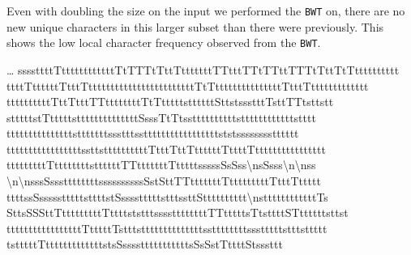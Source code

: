 \documentclass{article}
\begin{document}
Even with doubling the size on the input we performed the \texttt{BWT} on, there are no new unique characters in this larger subset than there were previously. This shows the low local character frequency observed from the \texttt{BWT}.
\begin{center}\footnotesize
\dots
ssssttttTttttttttttttTtTTTtTttTtttttttTTtttTTtTTttTTTtTttTtTtttttttttt
ttttTttttttTtttTttttttttttttttttttttttttTtTtttttttttttttttTtttTttttttttttttt
ttttttttttTttTtttTTttttttttTtTtttt\textvisiblespace tstttttt\textvisiblespace Stt\textvisiblespace st\textvisiblespace ssstttT\textvisiblespace st\textvisiblespace tTTtstt\textvisiblespace stt
stt\textvisiblespace tttstTtttttsttttttttttttttS\textvisiblespace ss\textvisiblespace \textvisiblespace sTtTt\textvisiblespace s\textvisiblespace sttttttttttsttttttttttttstttt
tttt\textvisiblespace tttttttttttsttttttts\textvisiblespace \textvisiblespace \textvisiblespace \textvisiblespace s\textvisiblespace s\textvisiblespace \textvisiblespace tttsstttttttttttttttttststsssssssstttttt
tttttttttttttttttssttsttttttttttTtttTttTttt\textvisiblespace tttTttt\textvisiblespace \textvisiblespace \textvisiblespace tTtttttttttttttt\textvisiblespace tt
tttttttttTtttttttt\textvisiblespace \textvisiblespace s\textvisiblespace tt\textvisiblespace ttttTTtttttttTttttt\textvisiblespace ss\textvisiblespace ss\textvisiblespace sSs\textvisiblespace Ss\textvisiblespace s\textbackslash\textvisiblespace n\textvisiblespace sSsss\textbackslash\textvisiblespace n\textbackslash\textvisiblespace n\textvisiblespace \textvisiblespace s\textvisiblespace \textvisiblespace s
\textbackslash\textvisiblespace n\textvisiblespace \textvisiblespace \textbackslash\textvisiblespace n\textvisiblespace s\textvisiblespace ss\textvisiblespace \textvisiblespace Ss\textvisiblespace s\textvisiblespace sttttttttssssss\textvisiblespace ss\textvisiblespace ssSs\textvisiblespace tSttTTtttttttT\textvisiblespace tttttttttTtttTttttt
ttt\textvisiblespace tssSss\textvisiblespace ssstttttsttttst\textvisiblespace Ssssstttttsttt\textvisiblespace ssttStttttttttt\textbackslash\textvisiblespace nsttttttttttttT\textvisiblespace \textvisiblespace s
St\textvisiblespace tsSSSttTtttttttttTtttt\textvisiblespace ststttssss\textvisiblespace ttttttttTTtttttsTtstttt\textvisiblespace STttttttstts\textvisiblespace t
ttttttttttt\textvisiblespace ttttttTtttttTstttstttt\textvisiblespace ttttttttttssttttttttss\textvisiblespace stttttstttstt\textvisiblespace ttt
t\textvisiblespace \textvisiblespace stttttTtttttttttttttst\textvisiblespace sS\textvisiblespace s\textvisiblespace sss\textvisiblespace \textvisiblespace \textvisiblespace ttttttttttt\textvisiblespace sSs\textvisiblespace Ss\textvisiblespace t\textvisiblespace \textvisiblespace Tt\textvisiblespace tttSt\textvisiblespace ssst\textvisiblespace tt

\end{center}
\end{document}
